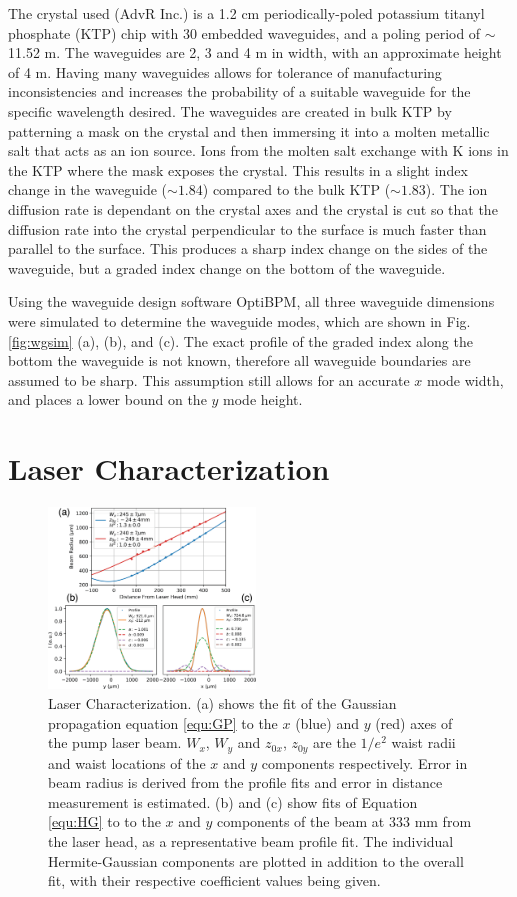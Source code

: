 \documentclass[9pt,twocolumn,twoside]{pnas-new}
\begin{document}
The crystal used (AdvR Inc.) is a 1.2 cm periodically-poled potassium titanyl phosphate (KTP) chip with 30 embedded waveguides, and a poling period of $\sim$ 11.52 \textmu m. The waveguides are 2, 3 and 4 \textmu m in width, with an approximate height of 4 \textmu m. Having many waveguides allows for tolerance of manufacturing inconsistencies and increases the probability of a suitable waveguide for the specific wavelength desired. The waveguides are created in bulk KTP by patterning a mask on the crystal and then immersing it into a molten metallic salt that acts as an ion source. Ions from the molten salt exchange with K ions in the KTP where the mask exposes the crystal. This results in a slight index change in the waveguide ($\sim 1.84$) compared to the bulk KTP ($\sim 1.83$). The ion diffusion rate is dependant on the crystal axes and the crystal is cut so that the diffusion rate into the crystal perpendicular to the surface is much faster than parallel to the surface. This produces a sharp index change on the sides of the waveguide, but a graded index change on the bottom of the waveguide.

Using the waveguide design software OptiBPM, all three waveguide dimensions were simulated to determine the waveguide modes, which are shown in Fig. \ref{fig:wgsim} (a), (b), and (c). The exact profile of the graded index along the bottom the waveguide is not known, therefore all waveguide boundaries are assumed to be sharp. This assumption still allows for an accurate $x$ mode width, and places a lower bound on the $y$ mode height. 

\section*{Laser Characterization}

\begin{figure}
	\centering
	\includegraphics[width=0.49\textwidth]{propag_fig}
	\caption{Laser Characterization. (a) shows the fit of the Gaussian propagation equation \ref{equ:GP} to the $x$ (blue) and $y$ (red) axes of the pump laser beam. $W_x$, $W_y$ and $z_{0x}$, $z_{0y}$ are the $1/e^2$ waist radii and waist locations of the $x$ and $y$ components respectively. Error in beam radius is derived from the profile fits and error in distance measurement is estimated. (b) and (c) show fits of Equation \ref{equ:HG} to to the $x$ and $y$ components of the beam at 333 mm from the laser head, as a representative beam profile fit. The individual Hermite-Gaussian components are plotted in addition to the overall fit, with their respective coefficient values being given.}
	\label{fig:laserchar}
\end{figure}
\end{document}
